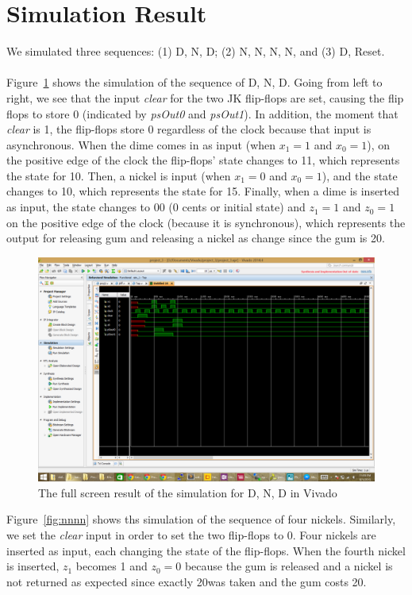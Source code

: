 \documentclass{article}
\begin{document}
\section{Simulation Result}
We simulated three sequences: (1) D, N, D; (2) N, N, N, N, and (3) D, Reset.\\
\\
Figure~\ref{fig:dnd} shows the simulation of the sequence of D, N, D. Going 
from left to right, we see that the input \textit{clear} for the two JK 
flip-flops are set, causing the flip flops to store 0 (indicated by 
\textit{psOut0} and \textit{psOut1}). In addition, the moment that 
\textit{clear} is 1, the flip-flops store 0 regardless of the clock because 
that input is asynchronous. When the dime comes in as input (when $x_1=1$ and 
$x_0=1$), on the positive edge of the clock the flip-flops' state changes to 
11, which represents the state for 10\textcent. Then, a nickel is input (when 
$x_1=0$ and $x_0=1$), and the state changes to 10, which represents the state 
for 15\textcent. Finally, when a dime is inserted as input, the state changes to 
00 (0 cents or initial state) and $z_1=1$ and $z_0=1$ on the positive edge of 
the clock (because it is synchronous), which represents the output for 
releasing gum and releasing a nickel as change since the gum is 20\textcent.

\clearpage

\begin{figure}[h!]
\centering
\includegraphics[scale=0.4]{DND}
\caption{The full screen result of the simulation for D, N, D in Vivado}
\label{fig:dnd}
\end{figure}

Figure~\ref{fig:nnnn} shows ths simulation of the sequence of four nickels. 
Similarly, we set the \textit{clear} input in order to set the two flip-flops 
to 0. Four nickels are inserted as input, each changing the state of the 
flip-flops.  When the fourth nickel is inserted, $z_1$ becomes 1 and $z_0=0$ 
because the gum is released and a nickel is not returned as expected since 
exactly 20\textcent was taken and the gum costs 20\textcent. 
\end{document}
